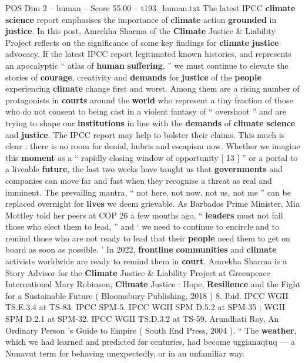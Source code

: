 \begin{textsample}{POS Dim 2 – human – Score 55.00 – t193\_human.txt}  \label{ex:f2_pos_025}
The latest IPCC \textbf{climate} \textbf{science} report emphasises the importance of \textbf{climate} action \textbf{grounded} in \textbf{justice}.
In this post, Amrekha Sharma of the \textbf{Climate} Justice \& Liability Project reflects on the significance of some key findings for \textbf{climate} \textbf{justice} advocacy.
If the latest IPCC report legitimated known histories, and represents an apocalyptic “ atlas of \textbf{human} \textbf{suffering}, ” we must continue to elevate the stories of \textbf{courage}, creativity and \textbf{demands} for \textbf{justice} of the \textbf{people} experiencing \textbf{climate} change first and worst.
Among them are a rising number of protagonists in \textbf{courts} around the \textbf{world} who represent a tiny fraction of those who do not consent to being cast in a violent fantasy of “ overshoot ” and are trying to shape our \textbf{institutions} in line with the \textbf{demands} of \textbf{climate} \textbf{science} and \textbf{justice}.
The IPCC report may help to bolster their claims.
This much is clear : there is no room for denial, hubris and escapism now.
Whether we imagine this \textbf{moment} as a “ rapidly closing window of opportunity [ 13 ] ” or a portal to a liveable \textbf{future}, the last two weeks have taught us that \textbf{governments} and companies can move far and fast when they recognise a threat as real and imminent.
The prevailing mantra, “ not here, not now, not us, not me ” can be replaced overnight for \textbf{lives} we deem grievable.
As Barbados Prime Minister, Mia Mottley told her peers at COP 26 a few months ago, “ \textbf{leaders} must not fail those who elect them to lead, ” and ‘ we need to continue to encircle and to remind those who are not ready to lead that their \textbf{people} need them to get on board as soon as possible. ’ In 2022, \textbf{frontline} \textbf{communities} and \textbf{climate} activists worldwide are ready to remind them in \textbf{court}.
Amrekha Sharma is a Story Advisor for the \textbf{Climate} Justice \& Liability Project at Greenpeace International Mary Robinson, \textbf{Climate} Justice : Hope, \textbf{Resilience} and the Fight for a Sustainable Future ( Bloomsbury Publishing, 2018 ) 8.
Ibid.
IPCC WGII TS.E.3.4 at TS-83.
IPCC SPM-5.
IPCC WGII SPM D.5.2 at SPM-35 ; WGII SPM D.2.1 at SPM-32.
IPCC WGII TS.D.3.2 at TS-59.
Arundhati Roy, An Ordinary Person ’s Guide to Empire ( South End Press, 2004 ). “ The \textbf{weather}, which we had learned and predicted for centuries, had become uggianaqtuq — a Nunavut term for behaving unexpectedly, or in an unfamiliar way.

\end{textsample}
